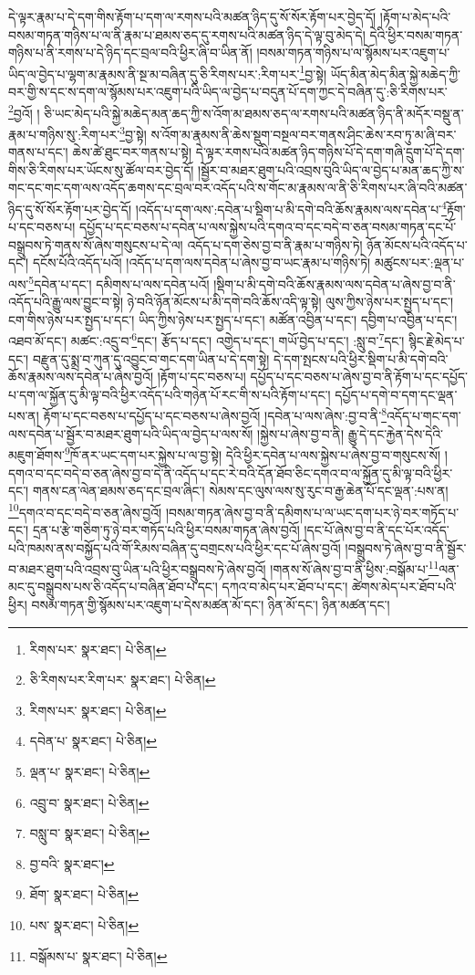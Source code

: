 དེ་ལྟར་རྣམ་པ་དེ་དག་གིས་རྟོག་པ་དག་ལ་རགས་པའི་མཚན་ཉིད་དུ་སོ་སོར་རྟོག་པར་བྱེད་དོ། །རྟོག་པ་མེད་པའི་བསམ་གཏན་གཉིས་པ་ལ་ནི་རྣམ་པ་ཐམས་ཅད་དུ་རགས་པའི་མཚན་ཉིད་དེ་ལྟ་བུ་མེད་དེ། དེའི་ཕྱིར་བསམ་གཏན་གཉིས་པ་ནི་རགས་པ་དེ་ཉིད་དང་བྲལ་བའི་ཕྱིར་ཞི་བ་ཡིན་ནོ། །བསམ་གཏན་གཉིས་པ་ལ་སྙོམས་པར་འཇུག་པ་ཡིད་ལ་བྱེད་པ་ལྷག་མ་རྣམས་ནི་སྔ་མ་བཞིན་དུ་ཅི་རིགས་པར་:རིག་པར་\footnote{རིགས་པར་  སྣར་ཐང་།  པེ་ཅིན། }བྱ་སྟེ། ཡོད་མིན་མེད་མིན་སྐྱེ་མཆེད་ཀྱི་བར་གྱི་ས་དང་ས་དག་ལ་སྙོམས་པར་འཇུག་པའི་ཡིད་ལ་བྱེད་པ་བདུན་པོ་དག་ཀྱང་དེ་བཞིན་དུ་:ཅི་རིགས་པར་\footnote{ཅི་རིགས་པར་རིག་པར་  སྣར་ཐང་།  པེ་ཅིན། }བྱའོ། །
ཅི་ཡང་མེད་པའི་སྐྱེ་མཆེད་མན་ཆད་ཀྱི་ས་འོག་མ་ཐམས་ཅད་ལ་རགས་པའི་མཚན་ཉིད་ནི་མདོར་བསྡུ་ན་རྣམ་པ་གཉིས་སུ་:རིག་པར་\footnote{རིགས་པར་  སྣར་ཐང་།  པེ་ཅིན། }བྱ་སྟེ། ས་འོག་མ་རྣམས་ནི་ཆེས་སྡུག་བསྔལ་བར་གནས་ཤིང་ཆེས་རབ་ཏུ་མ་ཞི་བར་གནས་པ་དང་། ཆེས་ཚེ་ཐུང་བར་གནས་པ་སྟེ། དེ་ལྟར་རགས་པའི་མཚན་ཉིད་གཉིས་པོ་དེ་དག་གཞི་དྲུག་པོ་དེ་དག་གིས་ཅི་རིགས་པར་ཡོངས་སུ་ཚོལ་བར་བྱེད་དོ། །སྦྱོར་བ་མཐར་ཐུག་པའི་འབྲས་བུའི་ཡིད་ལ་བྱེད་པ་མན་ཆད་ཀྱི་ས་གང་དང་གང་དག་ལས་འདོད་ཆགས་དང་བྲལ་བར་འདོད་པའི་ས་གོང་མ་རྣམས་ལ་ནི་ཅི་རིགས་པར་ཞི་བའི་མཚན་ཉིད་དུ་སོ་སོར་རྟོག་པར་བྱེད་དོ། །འདོད་པ་དག་ལས་:དབེན་པ་སྡིག་པ་མི་དགེ་བའི་ཆོས་རྣམས་ལས་དབེན་པ་\footnote{དབེན་པ་  སྣར་ཐང་།  པེ་ཅིན། }རྟོག་པ་དང་བཅས་པ། དཔྱོད་པ་དང་བཅས་པ་དབེན་པ་ལས་སྐྱེས་པའི་དགའ་བ་དང་བདེ་བ་ཅན་བསམ་གཏན་དང་པོ་བསྒྲུབས་ཏེ་གནས་སོ་ཞེས་གསུངས་པ་དེ་ལ། འདོད་པ་དག་ཅེས་བྱ་བ་ནི་རྣམ་པ་གཉིས་ཏེ། ཉོན་མོངས་པའི་འདོད་པ་དང་། དངོས་པོའི་འདོད་པའོ། །འདོད་པ་དག་ལས་དབེན་པ་ཞེས་བྱ་བ་ཡང་རྣམ་པ་གཉིས་ཏེ། མཚུངས་པར་:ལྡན་པ་ལས་\footnote{ལྡན་པ་  སྣར་ཐང་།  པེ་ཅིན། }དབེན་པ་དང་། དམིགས་པ་ལས་དབེན་པའོ། །སྡིག་པ་མི་དགེ་བའི་ཆོས་རྣམས་ལས་དབེན་པ་ཞེས་བྱ་བ་ནི་འདོད་པའི་རྒྱུ་ལས་བྱུང་བ་སྟེ། ཉེ་བའི་ཉོན་མོངས་པ་མི་དགེ་བའི་ཆོས་འདི་ལྟ་སྟེ། ལུས་ཀྱིས་ཉེས་པར་སྤྱད་པ་དང་། ངག་གིས་ཉེས་པར་སྤྱད་པ་དང་། ཡིད་ཀྱིས་ཉེས་པར་སྤྱད་པ་དང་། མཚོན་འབྱིན་པ་དང་། དབྱིག་པ་འབྱིན་པ་དང་། འཐབ་མོ་དང་། མཚང་:འདྲུ་བ་\footnote{འབྲུ་བ་  སྣར་ཐང་།  པེ་ཅིན། }དང་། རྩོད་པ་དང་། འགྱེད་པ་དང་། གཡོ་བྱེད་པ་དང་། :སླུ་བ་\footnote{བསླུ་བ་  སྣར་ཐང་།  པེ་ཅིན། }དང་། སྙིང་རྗེ་མེད་པ་དང་། བརྫུན་དུ་སྨྲ་བ་ཀུན་དུ་འབྱུང་བ་གང་དག་ཡིན་པ་དེ་དག་སྟེ། དེ་དག་སྤངས་པའི་ཕྱིར་སྡིག་པ་མི་དགེ་བའི་ཆོས་རྣམས་ལས་དབེན་པ་ཞེས་བྱའོ། །རྟོག་པ་དང་བཅས་པ། དཔྱོད་པ་དང་བཅས་པ་ཞེས་བྱ་བ་ནི་རྟོག་པ་དང་དཔྱོད་པ་དག་ལ་སྐྱོན་དུ་མི་ལྟ་བའི་ཕྱིར་འདོད་པའི་གཉེན་པོ་རང་གི་ས་པའི་རྟོག་པ་དང་། དཔྱོད་པ་དགེ་བ་དག་དང་ལྡན་པས་ན། རྟོག་པ་དང་བཅས་པ་དཔྱོད་པ་དང་བཅས་པ་ཞེས་བྱའོ། །དབེན་པ་ལས་ཞེས་:བྱ་བ་ནི་\footnote{བྱ་བའི་  སྣར་ཐང་། }འདོད་པ་གང་དག་ལས་དབེན་པ་སྦྱོར་བ་མཐར་ཐུག་པའི་ཡིད་ལ་བྱེད་པ་ལས་སོ། །སྐྱེས་པ་ཞེས་བྱ་བ་ནི། རྒྱུ་དེ་དང་རྐྱེན་དེས་དེའི་མཇུག་ཐོགས་\footnote{ཐོག་  སྣར་ཐང་།  པེ་ཅིན། }ཁོ་ནར་ཡང་དག་པར་སྐྱེས་པ་ལ་བྱ་སྟེ། དེའི་ཕྱིར་དབེན་པ་ལས་སྐྱེས་པ་ཞེས་བྱ་བ་གསུངས་སོ། །དགའ་བ་དང་བདེ་བ་ཅན་ཞེས་བྱ་བ་དེ་ནི་འདོད་པ་དང་རེ་བའི་དོན་ཐོབ་ཅིང་དགའ་བ་ལ་སྐྱོན་དུ་མི་ལྟ་བའི་ཕྱིར་དང་། གནས་ངན་ལེན་ཐམས་ཅད་དང་བྲལ་ཞིང་། སེམས་དང་ལུས་ལས་སུ་རུང་བ་རྒྱ་ཆེན་པོ་དང་ལྡན་:པས་ན། \footnote{པས་  སྣར་ཐང་།  པེ་ཅིན། }དགའ་བ་དང་བདེ་བ་ཅན་ཞེས་བྱའོ། །བསམ་གཏན་ཞེས་བྱ་བ་ནི་དམིགས་པ་ལ་ཡང་དག་པར་ཉེ་བར་གཏོད་པ་དང་། དྲན་པ་རྩེ་གཅིག་ཏུ་ཉེ་བར་གཏོད་པའི་ཕྱིར་བསམ་གཏན་ཞེས་བྱའོ། །དང་པོ་ཞེས་བྱ་བ་ནི་དང་པོར་འདོད་པའི་ཁམས་ནས་བསྐྱོད་པའི་གོ་རིམས་བཞིན་དུ་བགྲངས་པའི་ཕྱིར་དང་པོ་ཞེས་བྱའོ། །བསྒྲུབས་ཏེ་ཞེས་བྱ་བ་ནི་སྦྱོར་བ་མཐར་ཐུག་པའི་འབྲས་བུ་ཡིན་པའི་ཕྱིར་བསྒྲུབས་ཏེ་ཞེས་བྱའོ། །གནས་སོ་ཞེས་བྱ་བ་ནི་ཕྱིས་:བསྒོམ་པ་\footnote{བསྒོམས་པ་  སྣར་ཐང་།  པེ་ཅིན། }ལན་མང་དུ་བསྒྲུབས་པས་ཅི་འདོད་པ་བཞིན་ཐོབ་པ་དང་། དཀའ་བ་མེད་པར་ཐོབ་པ་དང་། ཚེགས་མེད་པར་ཐོབ་པའི་ཕྱིར། བསམ་གཏན་གྱི་སྙོམས་པར་འཇུག་པ་དེས་མཚན་མོ་དང་། ཉིན་མོ་དང་། ཉིན་མཚན་དང་། 